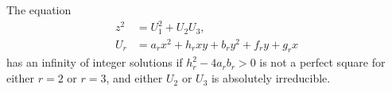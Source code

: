 \begin{proposition}
    The equation
\[
    \begin{aligned}z^2&=U_1^2+U_2U_3,\\U_r&=a_rx^2+h_rxy+b_ry^2+f_ry+g_rx\end{aligned}
\]
    has an infinity of integer solutions if $h_r^2-4a_rb_r>0$ is not a perfect square for either $r=2$ or $r=3$, and either $U_2$ or $U_3$ is absolutely irreducible.
\end{proposition}
